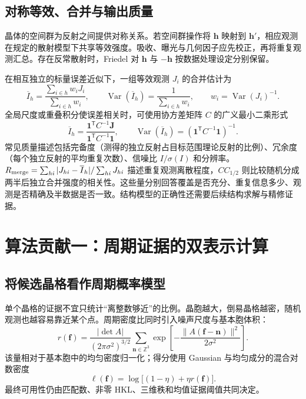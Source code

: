 \documentclass[UTF8,11pt,a4paper,fontset=fandol]{ctexart}
\newcommand{\T}{\mathsf{T}}
\begin{document}
\subsection{对称等效、合并与输出质量}
晶体的空间群为反射之间提供对称关系。若空间群操作将 $\bm h$ 映射到 $\bm h'$，相应观测在规定的散射模型下共享等效强度。吸收、曝光与几何因子应先校正，再将重复观测汇总。存在反常散射时，Friedel 对 $\bm h$ 与 $-\bm h$ 按数据处理设定分别保留。

在相互独立的标量误差近似下，一组等效观测 $J_i$ 的合并估计为
\begin{equation}
\overline I_h=\frac{\sum_{i\in h}w_iJ_i}{\sum_{i\in h}w_i},\qquad
\operatorname{Var}(\overline I_h)=\frac1{\sum_{i\in h}w_i},\qquad
w_i=\operatorname{Var}(J_i)^{-1}.
\end{equation}
全局尺度或重叠积分使误差相关时，可使用协方差矩阵 $C$ 的广义最小二乘形式
\begin{equation}
\overline I_h=\frac{\bm1^\T C^{-1}\bm J}{\bm1^\T C^{-1}\bm1},\qquad
\operatorname{Var}(\overline I_h)=(\bm1^\T C^{-1}\bm1)^{-1}.
\end{equation}
常见质量描述包括完备度（测得的独立反射占目标范围理论反射的比例）、冗余度（每个独立反射的平均重复次数）、信噪比 $I/\sigma(I)$ 和分辨率。$R_{\rm merge}=\sum_{hi}|J_{hi}-\overline I_h|/\sum_{hi}J_{hi}$ 描述重复观测离散程度，$CC_{1/2}$ 则比较随机分成两半后独立合并强度的相关性。这些量分别回答覆盖是否充分、重复信息多少、观测是否精确及半数据是否一致。结构模型的正确性还需要后续结构求解与精修证据。

\section{算法贡献一：周期证据的双表示计算}
\subsection{将候选晶格看作周期概率模型}
单个晶格的证据不宜只统计“离整数够近”的比例。晶胞越大，倒易晶格越密，随机观测也越容易靠近某个点。周期密度比同时引入噪声尺度与基本胞体积：
\begin{equation}\label{eq:real}
r(\bm f)=\frac{|\det A|}{(2\pi\sigma^2)^{3/2}}
\sum_{\bm n\in\mathbb Z^3}
\exp\left[-\frac{\|A(\bm f-\bm n)\|^2}{2\sigma^2}\right].
\end{equation}
该量相对于基本胞中的均匀密度归一化；得分使用 Gaussian 与均匀成分的混合对数密度
\begin{equation}
\ell(\bm f)=\log\bigl[(1-\eta)+\eta r(\bm f)\bigr].
\end{equation}
最终可用性仍由匹配数、非零 HKL、三维秩和均值证据阈值共同决定。
\end{document}
